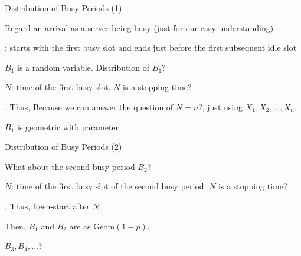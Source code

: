 \begin{frame}{Distribution of Busy Periods (1)}

\plitemsep 0.05in
\bci
\item Regard an arrival as a server being busy (just for our easy understanding)

\item<2-> : starts with the first busy slot and ends just before the first subsequent idle slot


\item<3->  $B_1$ is a random variable. Distribution of $B_1$?


\item<4-> $N$: time of the first busy slot. $N$ is a stopping time? 

  \bci
  \item<5-> . Thus,  Because we can answer the question of $N=n$?, just using
    $X_1, X_2, \ldots, X_n$.
  \eci
\item<6-> $B_1$ is geometric with parameter 

\eci
\end{frame}

\begin{frame}{Distribution of Busy Periods (2)}

  
  \plitemsep 0.1in
  \bci
\item \question What about the second busy period $B_2$? 
  
\item<2-> $N$: time of the first busy slot of the second busy
  period. $N$ is a stopping time? 


\item<3-> . Thus, fresh-start after $N.$ 

\item<4-> Then, $B_1$ and $B_2$ are  as $\text{Geom}(1-p).$
\item<5-> $B_3, B_4, \ldots$? 
    \eci
\end{frame}

